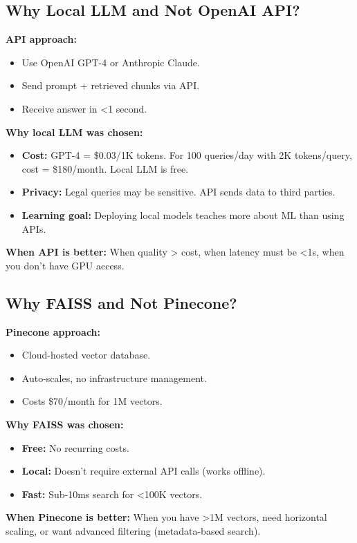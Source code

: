 \documentclass[11pt,a4paper]{article}
\begin{document}
\subsection{Why Local LLM and Not OpenAI API?}

\textbf{API approach:}
\begin{itemize}
\item Use OpenAI GPT-4 or Anthropic Claude.
\item Send prompt + retrieved chunks via API.
\item Receive answer in <1 second.
\end{itemize}

\textbf{Why local LLM was chosen:}
\begin{itemize}
\item \textbf{Cost:} GPT-4 = \$0.03/1K tokens. For 100 queries/day with 2K tokens/query, cost = \$180/month. Local LLM is free.
\item \textbf{Privacy:} Legal queries may be sensitive. API sends data to third parties.
\item \textbf{Learning goal:} Deploying local models teaches more about ML than using APIs.
\end{itemize}

\textbf{When API is better:} When quality > cost, when latency must be <1s, when you don't have GPU access.

\subsection{Why FAISS and Not Pinecone?}

\textbf{Pinecone approach:}
\begin{itemize}
\item Cloud-hosted vector database.
\item Auto-scales, no infrastructure management.
\item Costs \$70/month for 1M vectors.
\end{itemize}

\textbf{Why FAISS was chosen:}
\begin{itemize}
\item \textbf{Free:} No recurring costs.
\item \textbf{Local:} Doesn't require external API calls (works offline).
\item \textbf{Fast:} Sub-10ms search for <100K vectors.
\end{itemize}

\textbf{When Pinecone is better:} When you have >1M vectors, need horizontal scaling, or want advanced filtering (metadata-based search).
\end{document}

